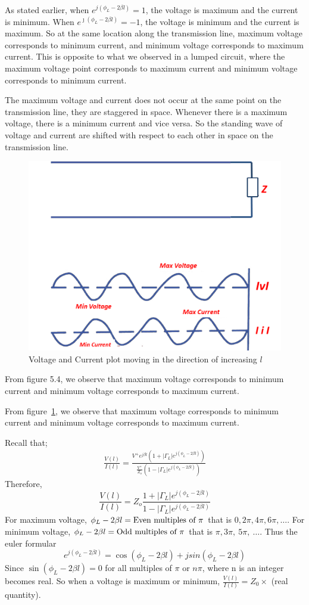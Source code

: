 As stated earlier, when $ e^{j(\phi_L - 2 \beta l)} = 1$, the voltage is maximum and the current is minimum. When $ e^{\jmath(\phi_L - 2 \beta l)} = -1$, the voltage is minimum and the current is maximum. So at the same location along the transmission line, maximum voltage corresponds to minimum current, and minimum voltage corresponds to maximum current. This is opposite to what we observed in a lumped circuit, where the maximum voltage point corresponds to maximum current and minimum voltage corresponds to minimum current.

The maximum voltage and current does not occur at the same point on the transmission line, they are staggered in space. Whenever there is a maximum voltage, there is a minimum current and vice versa. So the standing wave of voltage and current are shifted with respect to each other in space on the transmission line. 
\begin{figure}[h]
\centering
\includegraphics[width=0.7\linewidth]{./graphics/fig5.4modified}
\caption{Voltage and Current plot moving in the direction of increasing $l$}
\label{fig:asdfghjhgfdsa}
\end{figure}
From figure 5.4, we observe that maximum voltage corresponds to minimum current and minimum voltage corresponds to maximum current.

From figure~\ref{fig:asdfghjhgfdsa}, we observe that maximum voltage corresponds to minimum current and minimum voltage corresponds to maximum current.

Recall that;
\begin{align*}
\frac{V(l)}{I(l)} = \frac{V^{+}e^{j\beta l}(1+ |\Gamma_L|e^{j(\phi_L- 2 \beta l)})}{\frac{V^{+}}{Z_o}(1- |\Gamma_L|e^{j(\phi_L- 2\beta l)})}
\end{align*}
Therefore,
\begin{equation*}
\frac{V(l)}{I(l)} = Z_o \frac{1+ |\Gamma_L|e^{j(\phi_L- 2 \beta l)}}{1- |\Gamma_L|e^{j(\phi_L- 2\beta l)}}
\end{equation*}
For maximum voltage, $\phi_L-2\beta l = \textnormal{Even multiples of }\pi$ that is $0, 2\pi, 4\pi,  6\pi,\ldots$. For minimum voltage,  $\phi_L-2\beta l=\textnormal{Odd multiples of } \pi$ that is $\pi, 3\pi,\ 5\pi,\ \ldots$. Thus the euler formular 
\[e^{j(\phi_L - 2 \beta l)} = \cos(\phi_L - 2 \beta l) + jsin(\phi_L - 2 \beta l)\]
Since $\sin(\phi_L - 2 \beta l) = 0$ for all multiples of $\pi$ or $n\pi$, where n is an integer becomes real. So when a voltage is maximum or minimum, $\frac{V(l)}{I(l)} = Z_0 \times$ (real quantity).

